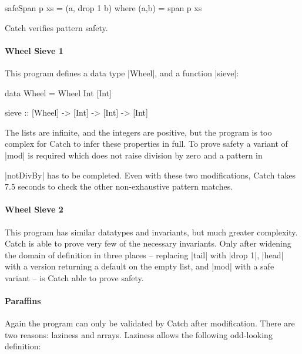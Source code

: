 \documentclass[preprint]{sigplanconf}
\begin{document}
\begin{code}
safeSpan p xs = (a, drop 1 b) where (a,b) = span p xs
\end{code}

\noindent Catch verifies pattern safety.

\paragraph{Wheel Sieve 1}

This program defines a data type |Wheel|, and a function |sieve|:

\pagebreak[3]
\begin{code}
data Wheel = Wheel Int [Int]

sieve :: [Wheel] -> [Int] -> [Int] -> [Int]
\end{code}

The lists are infinite, and the integers are positive, but the program is too complex for Catch to infer these properties in full. To prove safety a variant of |mod| is required which does not raise division by zero and a pattern in \ignore|notDivBy| has to be completed. Even with these two modifications, Catch takes 7.5 seconds to check the other non-exhaustive pattern matches.


\paragraph{Wheel Sieve 2}

This program has similar datatypes and invariants, but much greater complexity. Catch is able to prove very few of the necessary invariants. Only after widening the domain of definition in three places -- replacing |tail| with |drop 1|, |head| with a version returning a default on the empty list, and |mod| with a safe variant -- is Catch able to prove safety.


\paragraph{Paraffins}

Again the program can only be validated by Catch after modification. There are two reasons: laziness and arrays. Laziness allows the following odd-looking definition:

\begin{comment}
\begin{code}
big_memory_computation = undefined
\end{code}
\end{comment}
\end{document}
